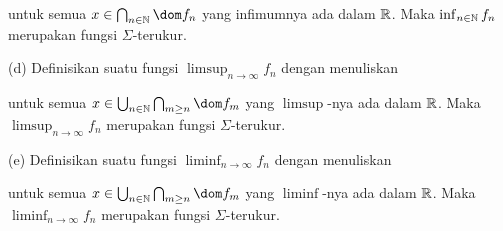 
\noindent untuk semua $x\in\bigcap_{n\in\Bbb N}\dom f_n$ yang
infimumnya ada dalam $\Bbb R$. Maka $\inf_{n\in\Bbb N}f_n$ merupakan
fungsi $\Sigma$-terukur.

(d) Definisikan suatu fungsi $\limsup_{n\to\infty}f_n$ dengan
menuliskan


\noindent untuk semua
$x\in\bigcup_{n\in\Bbb N}\bigcap_{m\ge n}\dom f_m$ yang $\limsup$-nya
ada dalam $\Bbb R$. Maka $\limsup_{n\to\infty}f_n$ merupakan fungsi
$\Sigma$-terukur.

(e) Definisikan suatu fungsi $\liminf_{n\to\infty}f_n$ dengan
menuliskan


\noindent untuk semua
$x\in\bigcup_{n\in\Bbb N}\bigcap_{m\ge n}\dom f_m$ yang $\liminf$-nya
ada dalam $\Bbb R$. Maka $\liminf_{n\to\infty}f_n$ merupakan fungsi
$\Sigma$-terukur.



